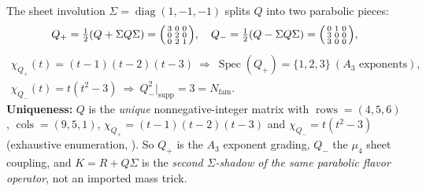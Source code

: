\documentclass[11pt,a4paper]{article}
\newcommand{\Nfam}{N_{\mathrm{fam}}}
\theoremstyle{definition}
\begin{document}
\begin{keybox}
The sheet involution $\Sigma=\operatorname{diag}(1,-1,-1)$ splits $Q$ into two parabolic pieces:
\[
  Q_+=\tfrac12(Q+\Sigma Q\Sigma)=\begin{psmallmatrix}3&0&0\\0&2&0\\0&2&1\end{psmallmatrix},\quad
  Q_-=\tfrac12(Q-\Sigma Q\Sigma)=\begin{psmallmatrix}0&1&0\\3&0&0\\3&0&0\end{psmallmatrix},
\]
\[
  \begin{gathered}
  \chi_{Q_+}(t)=(t-1)(t-2)(t-3)\ \Rightarrow\ \operatorname{Spec}(Q_+)=\{1,2,3\}\ (A_3\text{ exponents}),\\[2pt]
  \chi_{Q_-}(t)=t(t^2-3)\ \Rightarrow\ Q_-^2|_{\mathrm{supp}}=3=\Nfam .
  \end{gathered}
\]
\textbf{Uniqueness:} $Q$ is the \emph{unique} nonnegative-integer matrix with $\operatorname{rows}=(4,5,6)$,
$\operatorname{cols}=(9,5,1)$, $\chi_{Q_+}=(t-1)(t-2)(t-3)$ and $\chi_{Q_-}=t(t^2-3)$ (exhaustive
enumeration, ). So $Q_+$ is the $A_3$ exponent grading, $Q_-$ the $\mu_4$ sheet
coupling, and $K=R+Q\Sigma$ is the \emph{second $\Sigma$-shadow of the same parabolic flavor operator}, not
an imported mass trick.


\end{keybox}
\end{document}
